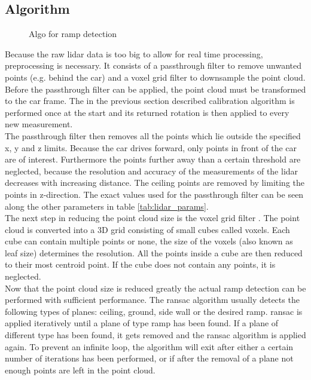 \subsection{Algorithm}
\begin{figure}[htb]
    \centering
    
    \caption{Algo for ramp detection}
    \label{fig:flowchart_lidar}
\end{figure}
Because the raw \gls{lidar} data is too big to allow for real time processing, preprocessing is necessary.
It consists of a passthrough filter to remove unwanted points (e.g. behind the car) and a voxel grid filter to downsample the point cloud.
Before the passthrough filter can be applied, the point cloud must be transformed to the car frame.
The in the previous section described calibration algorithm is performed once at the start and its returned rotation is then applied to every new measurement.\\
The passthrough filter then removes all the points which lie outside the specified x, y and z limits.
Because the car drives forward, only points in front of the car are of interest.
Furthermore the points further away than a certain threshold are neglected, because the resolution and accuracy of the measurements of the \gls{lidar} decreases with increasing distance.
The ceiling points are removed by limiting the points in z-direction.
The exact values used for the passthrough filter can be seen along the other parameters in table \ref{tab:lidar_params}.\\
The next step in reducing the point cloud size is the voxel grid filter \cite{Vosselman2004}.
The point cloud is converted into a 3D grid consisting of small cubes called voxels.
Each cube can contain multiple points or none, the size of the voxels (also known as leaf size) determines the resolution.
All the points inside a cube are then reduced to their most centroid point.
If the cube does not contain any points, it is neglected.\\
Now that the point cloud size is reduced greatly the actual ramp detection can be performed with sufficient performance.
The \gls{ransac} algorithm usually detects the following types of planes: ceiling, ground, side wall or the desired ramp.
\gls{ransac} is applied iteratively until a plane of type ramp has been found.
If a plane of different type has been found, it gets removed and the \gls{ransac} algorithm is applied again.
To prevent an infinite loop, the algorithm will exit after either a certain number of iterations has been performed, or if after the removal of a plane not enough points are left in the point cloud.\\

